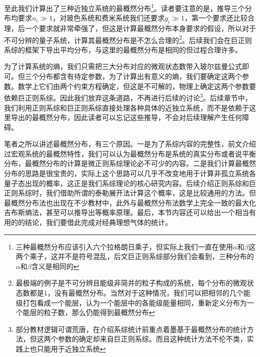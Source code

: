 \documentclass[../../main.tex]{subfiles}
\begin{document}
至此我们计算出了三种近独立系统的最概然分布\footnote{三种最概然分布应该引入六个拉格朗日乘子，但实际上我们一直在使用\(\alpha\)和\(\beta\)这两个乘子，这并不是符号混乱，后文巨正则系综部分我们会看到，三种分布的\(\alpha\)和\(\beta\)含义是相同的}。读者要注意的是，推导三个分布均要求\(n_i\gg 1\)，对玻色系统和费米系统我们还要求\(g_i\gg 1\)，第一个要求还比较合理，后一个要求就非常牵强了，但这是计算最概然分布本身要求的假设，所以对于不可分辨的量子系统，计算其最概然分布是不怎么合理的\footnote{最极端的例子是不可分辨且能级非简并的粒子构成的系统，每个分布的微观状态数都是1，没有最概然分布。当然对于这种情况，我们可以把相邻的几个能级打包看成一个能层，认为一个能层中的各能级能量相同，重新定义分布为一个能层的粒子数，那么仍能得到最概然分布}。后续我们会在巨正则系综的框架下导出平均分布，与这里的最概然分布是相同的但过程合理许多。

为了计算系统的熵，我们只需把三大分布对应的微观状态数带入玻尔兹曼公式即可。但三个分布都含有待定参数，为了计算出有意义的熵，我们要确定这两个参数。数学上它们由两个约束方程确定，但这是不可解的，物理上确定这两个参数要依赖巨正则系综。因此我们放弃这条道路，不再进行后续的讨论\footnote{部分教材逻辑可谓荒唐，在介绍系综统计前重点着墨基于最概然分布的统计方法，但这两个参数的确定却来自巨正则系综。而且这种统计方法不伦不类，实践上也只能用于近独立系统}。后续章节中，我们利用正则系综和巨正则系综直接处理各种具体的近独立系统，而不是依赖于这里导出的最概然分布，因此读者可以忘记这些推导，不会对后续理解产生任何障碍。

笔者之所以讲述最概然分布，有三个原因。一是为了系综内容的完整性，前文介绍过宏观系统的最概然特性，我们可以认为最概然分布是系统的真实分布或者说平衡分布，最概然分布的计算是微正则系综理论必不可少的内容。二是我们计算最概然分布的思路是很宝贵的，实际上这个思路可以几乎不改变地用于计算非孤立系统各量子态出现的概率，这正是我们系综理论的核心研究内容。后续介绍正则系综和巨正则系综时，我们借助所谓的泰勒展开法计算这个概率，这是比较通用的方法。但最概然分布法也出现在不少教材中，此外与最概然分布法数学上完全一致的最大化吉布斯熵法，甚至可以推导出等概率原理。最后，本节内容还可以给出一个相当有用的的结论，我们要借此完成对经典理想气体的统计。
\end{document}
